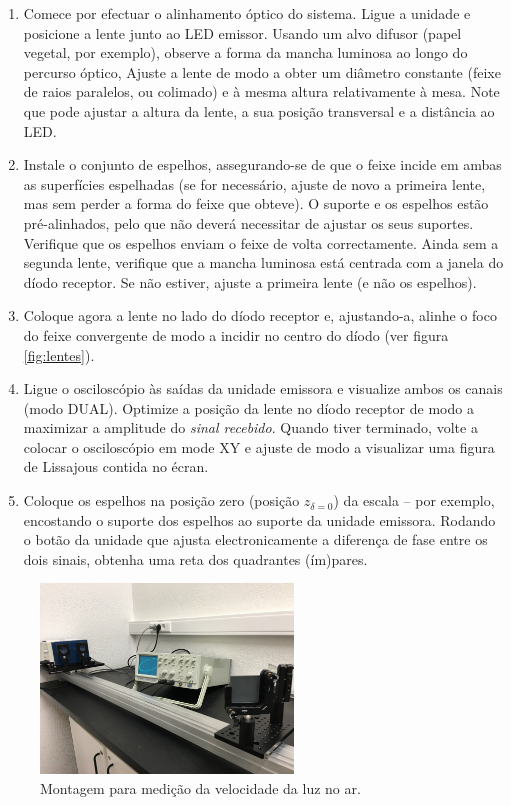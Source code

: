 \documentclass[12pt,a4paper,oneside]{paper}
\begin{document}
    \begin{enumerate}
    \setlength{\itemsep}{0mm}
    \item Comece por efectuar o alinhamento óptico do sistema. Ligue a unidade e posicione a lente junto ao LED emissor. Usando
    um alvo difusor (papel vegetal, por exemplo), observe a forma da mancha luminosa ao longo do percurso óptico, Ajuste a lente
    de modo a obter um diâmetro constante (feixe de raios paralelos, ou colimado) e à mesma altura relativamente à mesa. Note que
    pode ajustar a altura da lente, a sua posição transversal e a distância ao LED.
    \item Instale o conjunto de espelhos, assegurando-se de que o feixe incide em ambas as superfícies espelhadas (se for necessário,
    ajuste de novo a primeira lente, mas sem perder a forma do feixe que obteve). O suporte e os espelhos estão pré-alinhados, pelo
    que não deverá necessitar de ajustar os seus suportes. Verifique que os espelhos enviam o feixe de volta correctamente. Ainda sem
    a segunda lente, verifique que a mancha luminosa está centrada com  a janela do díodo receptor. Se não estiver, ajuste a primeira
    lente (e não os espelhos).
    \item Coloque agora a lente no lado do díodo receptor e, ajustando-a, alinhe o foco do feixe convergente de modo a incidir no
    centro do díodo (ver figura \ref{fig:lentes}).
    \item Ligue o osciloscópio às saídas da unidade emissora e visualize ambos os canais (modo DUAL). Optimize a posição da lente
    no díodo receptor de modo a maximizar a amplitude do \emph{sinal recebido}. Quando tiver terminado, volte a colocar o osciloscópio
    em mode XY e ajuste de modo a visualizar uma figura de Lissajous contida no écran.
    \item Coloque os espelhos na posição zero (posição $z_{\delta=0}$) da escala -- por exemplo, encostando o suporte dos espelhos
    ao suporte da unidade emissora. Rodando o botão da unidade que ajusta electronicamente a diferença de fase entre os dois sinais,
    obtenha uma reta dos quadrantes (ím)pares.
    \end{enumerate}
    \begin{figure}[H]  
        \centering 
        \includegraphics[width=0.6\textwidth]{./luz_images/fig6.jpg}
        \caption{Montagem para medição da velocidade da luz no ar. \label{fig:ar}} 
    \end{figure}
\end{document}
